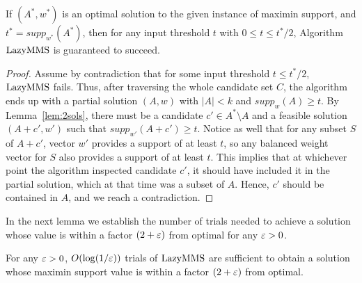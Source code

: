 \begin{lemma}\label{lem:success}
If $(A^*, w^*)$ is an optimal solution to the given instance of maximin support, and $t^*=supp_{w^*}(A^*)$, then for any input threshold $t$ with $0\leq t\leq t^*/2$, Algorithm $\operatorname{LazyMMS}$ is guaranteed to succeed.
\end{lemma}

\begin{proof}
Assume by contradiction that for some input threshold $t\leq t^*/2$, $\operatorname{LazyMMS}$ fails. Thus, after traversing the whole candidate set $C$, the algorithm ends up with a partial solution $(A,w)$ with $|A|<k$ and $supp_w(A)\geq t$. By Lemma~\ref{lem:2sols}, there must be a candidate $c'\in A^*\setminus A$ and a feasible solution $(A+c', w')$ such that $supp_{w'}(A+c')\geq t$. Notice as well that for any subset $S$ of $A+c'$, vector $w'$ provides a support of at least $t$, so any balanced weight vector for $S$ also provides a support of at least $t$. This implies that at whichever point the algorithm inspected candidate $c'$, it should have included it in the partial solution, which at that time was a subset of $A$. Hence, $c'$ should be contained in $A$, and we reach a contradiction.
\end{proof}

In the next lemma we establish the number of trials needed to achieve a solution whose value is within a factor $(2+\varepsilon)$ from optimal for any $\varepsilon>0$. 

\begin{lemma}\label{lem:lazybinary}
For any $\varepsilon>0$, $O(\log(1/\varepsilon))$ trials of $\operatorname{LazyMMS}$ are sufficient to obtain a solution whose maximin support value is within a factor $(2+\varepsilon)$ from optimal.
\end{lemma}

